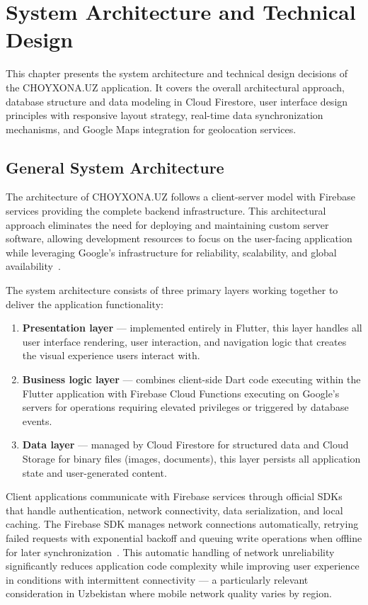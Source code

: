 \chapter{System Architecture and Technical Design}
\label{ch:architecture}

This chapter presents the system architecture and technical design decisions of the CHOYXONA.UZ application.
It covers the overall architectural approach, database structure and data modeling in Cloud Firestore, user interface design principles with responsive layout strategy, real-time data synchronization mechanisms, and Google Maps integration for geolocation services.


\section{General System Architecture}
\label{sec:system-arch}

The architecture of CHOYXONA.UZ follows a client-server model with Firebase services providing the complete backend infrastructure.
This architectural approach eliminates the need for deploying and maintaining custom server software, allowing development resources to focus on the user-facing application while leveraging Google's infrastructure for reliability, scalability, and global availability~\cite{moroney2017}.

The system architecture consists of three primary layers working together to deliver the application functionality:

\begin{enumerate}
  \item \textbf{Presentation layer} --- implemented entirely in Flutter, this layer handles all user interface rendering, user interaction, and navigation logic that creates the visual experience users interact with.
  \item \textbf{Business logic layer} --- combines client-side Dart code executing within the Flutter application with Firebase Cloud Functions executing on Google's servers for operations requiring elevated privileges or triggered by database events.
  \item \textbf{Data layer} --- managed by Cloud Firestore for structured data and Cloud Storage for binary files (images, documents), this layer persists all application state and user-generated content.
\end{enumerate}

Client applications communicate with Firebase services through official SDKs that handle authentication, network connectivity, data serialization, and local caching.
The Firebase SDK manages network connections automatically, retrying failed requests with exponential backoff and queuing write operations when offline for later synchronization~\cite{firebase_firestore2024}.
This automatic handling of network unreliability significantly reduces application code complexity while improving user experience in conditions with intermittent connectivity --- a particularly relevant consideration in Uzbekistan where mobile network quality varies by region.

